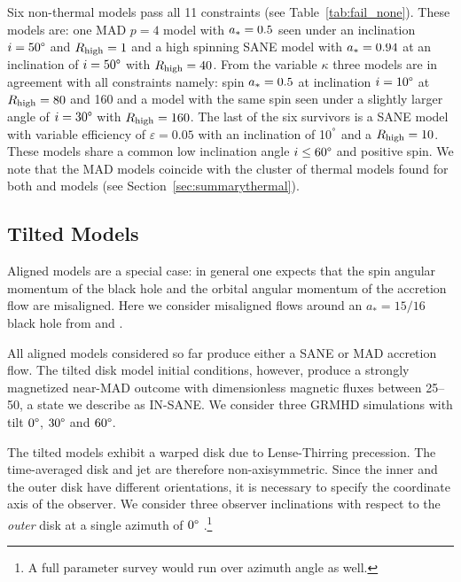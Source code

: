 

Six non-thermal models pass all 11 constraints (see Table~\ref{tab:fail_none}).
These models are:
one \hamr MAD $p=4$ model with $a_*=0.5$ seen under an inclination $i=50\degree$ and
$R_\mathrm{high}=1$ and a high spinning SANE model with $a_*=0.94$ at an inclination of $i=50\degree$ with $R_\mathrm{high}=40$.
From the \bhac variable $\kappa$ three models are in agreement with all constraints namely: spin $a_*=0.5$ at inclination $i=10\degree$ at $R_\mathrm{high}=80$ and 160 and a model with the same spin seen under a slightly larger angle of $i=30\degree$ with $R_\mathrm{high}=160$.
The last of the six survivors is a \bhac SANE model with variable efficiency of $\varepsilon=0.05$ with an inclination of 10$^\degree$ and a $R_\mathrm{high}=10$.
These models share a common low inclination angle $i \leq 60\degree$ and positive spin.
We note that the MAD models coincide with the cluster of thermal models found for both \bhac and \kharma models (see Section~\ref{sec:summarythermal}).




\subsection{Tilted Models}

Aligned models are a special case: in general one expects that the spin angular momentum of the black hole and the orbital angular momentum of the accretion flow are misaligned.
Here we consider misaligned flows around an $a_*=15/16$ black hole from \citet{Liska2018} and \citet{Chatterjee2020}.

All aligned models considered so far produce either a SANE or MAD accretion flow.
The tilted disk model initial conditions, however, produce a strongly magnetized near-MAD outcome with dimensionless magnetic fluxes between 25--50, a state we describe as  IN-SANE.
We consider three GRMHD simulations with tilt $0\degree$, $30\degree$ and $60\degree$.

The tilted models exhibit a warped disk due to  Lense-Thirring precession.
The time-averaged disk and jet are therefore non-axisymmetric.
Since the inner and the outer disk have different orientations, it is necessary to specify the coordinate axis of the observer.
We consider three  observer inclinations with respect to the {\em outer} disk at a single azimuth of $0\degree$ \citep[for more details, see][]{Chatterjee2020}.\footnote{A full parameter survey would run over azimuth angle as well.}

